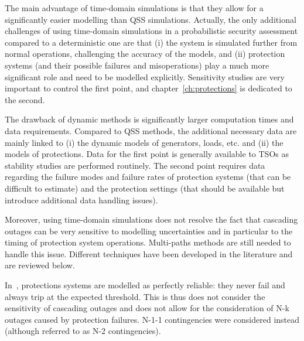 The main advantage of time-domain simulations is that they allow for a significantly easier modelling than QSS simulations. Actually, the only additional challenges of using time-domain simulations in a probabilistic security assessment compared to a deterministic one are that (i) the system is simulated further from normal operations, challenging the accuracy of the models, and (ii) protection systems (and their possible failures and misoperations) play a much more significant role and need to be modelled explicitly. Sensitivity studies are very important to control the first point, and chapter~\ref{ch:protections} is dedicated to the second.

The drawback of dynamic methods is significantly larger computation times and data requirements. Compared to QSS methods, the additional necessary data are mainly linked to (i) the dynamic models of generators, loads, etc. and (ii) the models of protections. Data for the first point is generally available to TSOs as stability studies are performed routinely.  The second point requires data regarding the failure modes and failure rates of protection systems (that can be difficult to estimate) and the protection settings (that should be available but introduce additional data handling issues).

Moreover, using time-domain simulations does not resolve the fact that cascading outages can be very sensitive to modelling uncertainties and in particular to the timing of protection system operations. Multi-paths methods are still needed to handle this issue. Different techniques have been developed in the literature and are reviewed below.

In~\cite{SongThesis, SongPaper, Preece1000RandomDynN-2}, protections systems are modelled as perfectly reliable: they never fail and always trip at the expected threshold. This is thus does not consider the sensitivity of cascading outages and does not allow for the consideration of N-k outages caused by protection failures. N-1-1 contingencies were considered instead (although referred to as N-2 contingencies).

